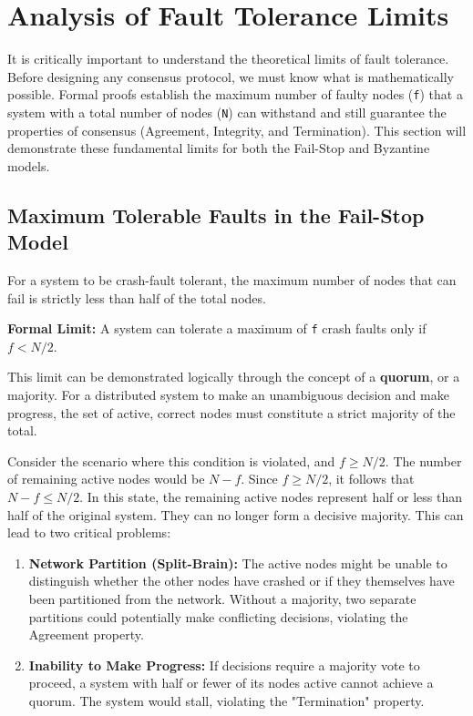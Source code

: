 \documentclass{scrbook}
\begin{document}
\section{Analysis of Fault Tolerance Limits}

It is critically important to understand the theoretical limits of fault
tolerance. Before designing any consensus protocol, we must know what is
mathematically possible. Formal proofs establish the maximum number of
faulty nodes (\texttt{f}) that a system with a total number of nodes
(\texttt{N}) can withstand and still guarantee the properties of
consensus (Agreement, Integrity, and Termination). This section will
demonstrate these fundamental limits for both the Fail-Stop and
Byzantine models.

\subsection{Maximum Tolerable Faults in the Fail-Stop Model}

For a system to be crash-fault tolerant, the maximum number of nodes
that can fail is strictly less than half of the total nodes.

\textbf{Formal Limit:} A system can tolerate a maximum of \texttt{f}
crash faults only if $f < N/2$.

This limit can be demonstrated logically through the concept of a
\textbf{quorum}, or a majority. For a distributed system to make an
unambiguous decision and make progress, the set of active, correct nodes
must constitute a strict majority of the total.

Consider the scenario where this condition is violated, and
$f \geq N/2$. The number of remaining active nodes would be
$N - f$. Since $f \geq N/2$, it follows that
$N-f \leq N/2$. In this state, the remaining active nodes
represent half or less than half of the original system. They can no
longer form a decisive majority. This can lead to two critical problems:

\begin{enumerate}
\item
  \textbf{Network Partition (Split-Brain):} The active nodes might be
  unable to distinguish whether the other nodes have crashed or if they
  themselves have been partitioned from the network. Without a majority,
  two separate partitions could potentially make conflicting decisions,
  violating the Agreement property.
\item
  \textbf{Inability to Make Progress:} If decisions require a majority
  vote to proceed, a system with half or fewer of its nodes active
  cannot achieve a quorum. The system would stall, violating the
  "Termination" property.
\end{enumerate}
\end{document}
